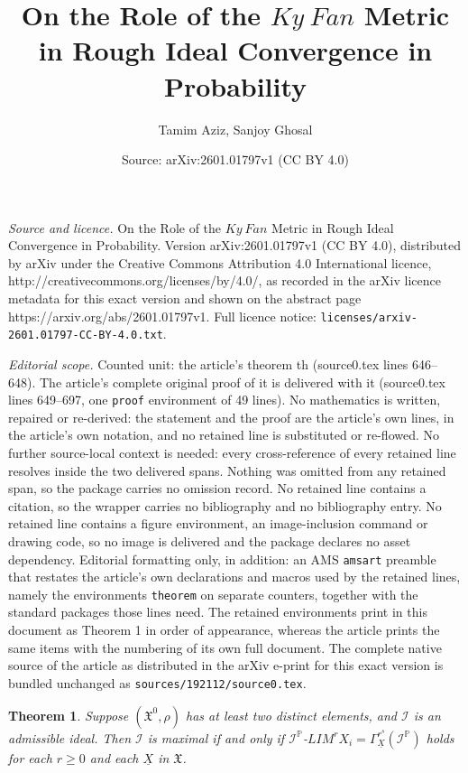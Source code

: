 \documentclass[10pt,a4paper]{amsart}
\title{On the Role of the $Ky~Fan$ Metric in Rough Ideal Convergence in Probability}
\author{Tamim Aziz, Sanjoy Ghosal}
\date{Source: arXiv:2601.01797v1 (CC BY 4.0)}
\newtheorem{theorem}{Theorem}
\begin{document}
\maketitle

\noindent\emph{Source and licence.} On the Role of the $Ky~Fan$ Metric in Rough Ideal Convergence in Probability. Version arXiv:2601.01797v1 (CC BY 4.0), distributed by arXiv under the Creative Commons Attribution 4.0 International licence, http://creativecommons.org/licenses/by/4.0/, as recorded in the arXiv licence metadata for this exact version and shown on the abstract page https://arxiv.org/abs/2601.01797v1. Full licence notice: \texttt{licenses/arxiv-2601.01797-CC-BY-4.0.txt}.\par\smallskip

\noindent\textit{Editorial scope.} Counted unit: the article's theorem th (source0.tex lines 646--648). The article's complete original proof of it is delivered with it (source0.tex lines 649--697, one \texttt{proof} environment of 49 lines). No mathematics is written, repaired or re-derived: the statement and the proof are the article's own lines, in the article's own notation, and no retained line is substituted or re-flowed.  No further source-local context is needed: every cross-reference of every retained line resolves inside the two delivered spans.  Nothing was omitted from any retained span, so the package carries no omission record.  No retained line contains a citation, so the wrapper carries no bibliography and no bibliography entry.  No retained line contains a figure environment, an image-inclusion command or drawing code, so no image is delivered and the package declares no asset dependency.  Editorial formatting only, in addition: an AMS \texttt{amsart} preamble that restates the article's own declarations and macros used by the retained lines, namely the environments \texttt{theorem} on separate counters, together with the standard packages those lines need.  The retained environments print in this document as Theorem 1 in order of appearance, whereas the article prints the same items with the numbering of its own full document.  The complete native source of the article as distributed in the arXiv e-print for this exact version is bundled unchanged as \texttt{sources/192112/source0.tex}.
\begin{theorem}\label{maximal th}
Suppose $(\mathfrak{X}^0, \rho)$ has at least two distinct elements, and $\mathcal{I}$ is an admissible ideal. Then $\mathcal{I}$ is maximal if and only if $\mathcal{I}^{\mathbb{P}}$-$LIM^rX_i=\Gamma^{r^s}_{\underline{X}}(\mathcal{I}^{\mathbb{P}})$ holds for each $r\geq 0$ and each $\underline{X}$ in $\mathfrak{X}$.
\end{theorem}
\end{document}
